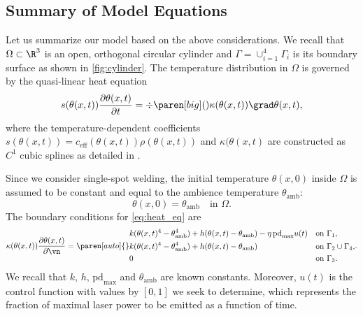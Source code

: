 \subsection{Summary of Model Equations}
\label{subsec:equations}

Let us summarize our model based on the above considerations.
We recall that $\Omega\subset \R^3$ is an open, orthogonal circular cylinder and $\Gamma = \cup_{i=1}^4 \Gamma_i$ is its boundary surface as shown in \cref{fig:cylinder}. 
The temperature distribution in $\Omega$ is governed by the quasi-linear heat equation
\begin{equation} \label{eq:heat_eq}
	s(\theta(x,t)) \frac{\partial \theta(x,t)}{\partial t} 
	= 
	\div \paren[big](){\kappa(\theta(x,t)) \grad\theta(x,t)}
	,
\end{equation}
where the temperature-dependent coefficients $s(\theta(x,t)) = c_\text{eff}(\theta(x,t)) \rho(\theta(x,t))$ and $\kappa(\theta(x,t)$ are constructed as $C^1$ cubic splines as detailed in \cite[\texttt{optipuls.coefficients}]{optipuls_github}.

Since we consider single-spot welding, the initial temperature $\theta(x,0)$ inside $\Omega$ is assumed to be constant and equal to the ambience temperature $\theta_\text{amb}$:
\begin{equation} \label{eq:heat_eq_ic}
	\theta(x,0)
	=
	\theta_\text{amb}
	\quad
	\text{in } \Omega
	.
\end{equation}
The boundary conditions for \eqref{eq:heat_eq} are
\begin{equation} \label{eq:heat_eq_bc}
	\kappa(\theta(x,t)) \frac{\partial \theta(x,t)}{\partial \vn} 
	= 
	\paren[auto]\{\}{%
		\begin{aligned}
			&
			k (\theta(x,t)^4 - \theta_\text{amb}^4) + h (\theta(x,t) - \theta_\text{amb}) - \eta\, \text{pd}_{\max} u(t)
			& 
			& 
			\text{on } \Gamma_1
			, 
			\\
			& 
			k (\theta(x,t)^4 - \theta_\text{amb}^4) + h (\theta(x,t) - \theta_\text{amb})
			& 
			& 
			\text{on } \Gamma_2 \cup \Gamma_4
			, 
			\\
			& 
			0
			& 
			& 
			\text{on } \Gamma_3
			.
		\end{aligned}
	}
	.
\end{equation}
We recall that $k$, $h$, $\text{pd}_{\max}$ and $\theta_\text{amb}$ are known constants.
Moreover, $u(t)$ is the control function with values by $[0,1]$ we seek to determine, which represents the fraction of maximal laser power to be emitted as a function of time.


